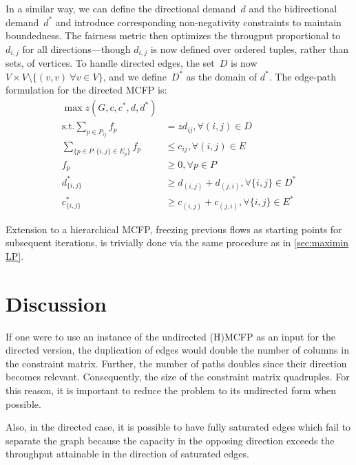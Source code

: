 In a similar way, we can define the directional demand~$d$ and the bidirectional demand~$d^*$ and introduce corresponding non-negativity constraints to maintain boundedness. The fairness metric then optimizes the througput proportional to $d_{i, j}$ for all directions---though $d_{i, j}$ is now defined over ordered tuples, rather than sets, of vertices. To handle directed edges, the set~$D$ is now $V \times V \setminus \{(v, v) \ \forall v \in V\}$, and we define~$D^*$ as the domain of $d^*$. The edge-path formulation for the directed MCFP is:
\begin{align}
    \max z(G, c, c^*, d, d^*) \\
    \mathrm{s.t.} \sum_{p \in P_{ij}} f_p &= zd_{ij}, \forall (i, j) \in D \\
    \sum_{\{p \in P:\{i,j\} \in E_p\}} f_p &\leq c_{ij}, \forall (i, j) \in E \\
    f_p &\geq 0,  \forall p \in P \\
    d^*_{\{i, j\}} &\geq d_{(i, j)} + d_{(j, i)}, \forall \{i, j\} \in D^* \\
    c^*_{\{i, j\}} &\geq c_{(i, j)} + c_{(j, i)}, \forall \{i, j\} \in E^*
\end{align}

Extension to a hierarchical MCFP, freezing previous flows as starting points for subsequent iterations, is trivially done via the same procedure as in \autoref{sec:maximin LP}.

\section{Discussion}

If one were to use an instance of the undirected (H)MCFP as an input for the directed version, the duplication of edges would double the number of columns in the constraint matrix. Further, the number of paths doubles since their direction becomes relevant. Consequently, the size of the constraint matrix quadruples. For this reason, it is important to reduce the problem to its undirected form when possible.

Also, in the directed case, it is possible to have fully saturated edges which fail to separate the graph because the capacity in the opposing direction exceeds the throughput attainable in the direction of saturated edges.  
